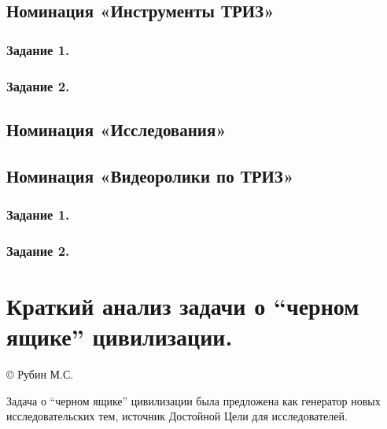 \documentclass[11pt,a4paper]{article}
\begin{document}
\subsection{Номинация «Инструменты ТРИЗ»}

\subsubsection*{Задание 1.}\BlackBox
\subsubsection*{Задание 2.}\CosmicInventions

\subsection{Номинация «Исследования»}

\BlackBoxOfCivilization

\subsection{Номинация «Видеоролики по ТРИЗ»}

\subsubsection*{Задание 1.}\VideoOne
\subsubsection*{Задание 2.}\VideoThree

\GeneralText
\clearpage

\section{Краткий анализ задачи о “черном ящике” цивилизации. }
\begin{center}
  © Рубин М.С.
\end{center}
Задача о “черном ящике” цивилизации была предложена как генератор новых
исследовательских тем, источник Достойной Цели для исследователей.  
\end{document}

